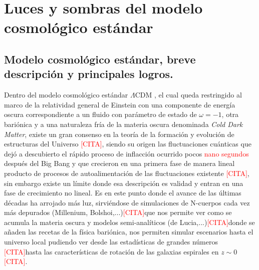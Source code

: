 
\chapter{Luces y sombras del modelo cosmológico estándar} %

\label{introduction} %


\newcommand{\keyword}[1]{\textbf{#1}}
\newcommand{\tabhead}[1]{\textbf{#1}}
\newcommand{\code}[1]{\texttt{#1}}
\newcommand{\file}[1]{\texttt{\bfseries#1}}
\newcommand{\option}[1]{\texttt{\itshape#1}}
\newcommand{\lcdm}{$\Lambda$CDM }
\newcommand{\addcite}{\textcolor{red}{[CITA]}}


\section{Modelo cosmológico estándar, breve descripción y principales logros.}
Dentro del modelo cosmológico estándar \lcdm, el cual queda restringido al marco de la relatividad general de Einstein con una componente de energía oscura correspondiente a un fluido con parámetro de estado de $\omega=-1$, otra bariónica  y a una 
naturaleza fría de la materia oscura denominada \textit{Cold Dark Matter}, existe un gran consenso en la teoría de la formación y evolución de estructuras del Universo \addcite, siendo su origen las fluctuaciones cuánticas que dejó a descubierto el rápido proceso de inflacción ocurrido pocos \textcolor{red}{nano segundos} después del Big Bang y que crecieron en una primera fase de manera lineal producto de procesos de autoalimentación de las fluctuaciones existente \addcite, sin embargo existe un límite donde esa descripción es validad y entran en una fase de crecimiento no lineal. Es en este punto donde el avance de las últimas décadas ha arrojado más luz, sirviéndose de simulaciones de N-cuerpos cada vez más depurados (Millenium, Bolshoi,...)\addcite que nos permite ver como se acumula la materia oscura y modelos semi-analíticos (de Lucia,...)\addcite donde se añaden las recetas de la física bariónica, nos permiten simular escenarios hasta el universo local pudiendo ver desde las estadísticas de grandes números \addcite hasta las características de rotación de las galaxias espirales en $z\sim 0$ \addcite.\\

